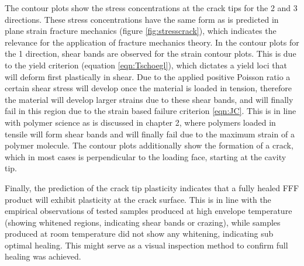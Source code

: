 The contour plots show the stress concentrations at the crack tips for the 2 and 3 directions. These stress concentrations have the same form as is predicted in plane strain fracture mechanics (figure \ref{fig:stresscrack}), which indicates the relevance for the application of fracture mechanics theory. In the contour plots for the 1 direction, shear bands are observed for the strain contour plots. This is due to the yield criterion (equation \ref{eqn:Tschoegl}), which dictates a yield loci that will deform first plastically in shear. Due to the applied positive Poisson ratio a certain shear stress will develop once the material is loaded in tension, therefore the material will develop larger strains due to these shear bands, and will finally fail in this region due to the strain based failure criterion \ref{eqn:JC}. This is in line with polymer science as is discussed in chapter 2, where polymers loaded in tensile will form shear bands and will finally fail due to the maximum strain of a polymer molecule. The contour plots additionally show the formation of a crack, which in most cases is perpendicular to the loading face, starting at the cavity tip. 

Finally, the prediction of the crack tip plasticity indicates that a fully healed FFF product will exhibit plasticity at the crack surface. This is in line with the empirical observations of tested samples produced at high envelope temperature (showing whitened regions, indicating shear bands or crazing), while samples produced at room temperature did not show any whitening, indicating sub optimal healing. This might serve as a visual inspection method to confirm full healing was achieved. 
%

